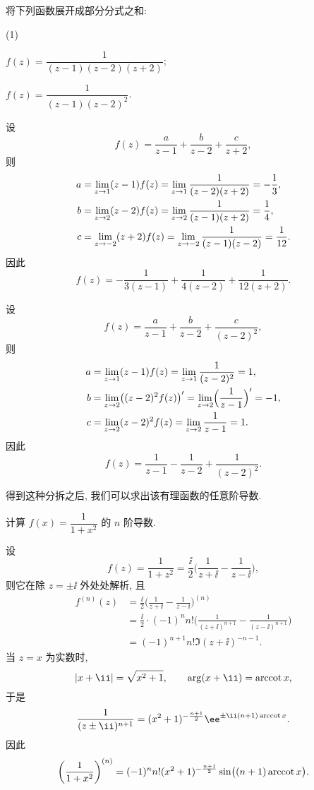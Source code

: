 \begin{example}
  将下列函数展开成部分分式之和:
  \begin{subexample}(1)
    \item $f(z)=\dfrac1{(z-1)(z-2)(z+2)}$;
    \item $f(z)=\dfrac{1}{(z-1)(z-2)^2}$.
  \end{subexample}
\end{example}

\begin{solutionenum}
  \item 设
  \[
    f(z)=\frac{a}{z-1}+\frac{b}{z-2}+\frac{c}{z+2},
  \]
  则
  \begin{align*}
    a&=\lim_{z\rightarrow1} (z-1)f(z)
      =\lim_{z\rightarrow1} \frac{1}{(z-2)(z+2)}
      =-\frac13,\\
    b&=\lim_{z\rightarrow2} (z-2)f(z)
      =\lim_{z\rightarrow2} \frac{1}{(z-1)(z+2)}
      =\frac14,\\
    c&=\lim_{z\rightarrow-2} (z+2)f(z)
      =\lim_{z\rightarrow-2} \frac{1}{(z-1)(z-2)}
      =\frac1{12}.
  \end{align*}
  因此
  \[
    f(z)=-\frac{1}{3(z-1)}+\frac{1}{4(z-2)}+\frac{1}{12(z+2)}.
  \]
  \item 设
  \[
    f(z)=\frac{a}{z-1}+\frac{b}{z-2}+\frac{c}{(z-2)^2},
  \]
  则
  \begin{align*}
    a&=\lim_{z\rightarrow1} (z-1)f(z)
      =\lim_{z\rightarrow1} \frac{1}{(z-2)^2}
      =1,\\
    b&=\lim_{z\rightarrow2} \bigl((z-2)^2f(z)\bigr)'
      =\lim_{z\rightarrow2} \Bigl(\frac{1}{z-1}\Bigr)'
      =-1,\\
    c&=\lim_{z\rightarrow2} (z-2)^2f(z)
      =\lim_{z\rightarrow2} \frac{1}{z-1}
      =1.
  \end{align*}
  因此
  \[
    f(z)=\frac{1}{z-1}-\frac{1}{z-2}+\frac{1}{(z-2)^2}.
  \]
\end{solutionenum}

得到这种分拆之后, 我们可以求出该有理函数的任意阶导数.

\begin{example}
  计算 $f(x)=\dfrac1{1+x^2}$ 的 $n$ 阶导数.
\end{example}

\begin{solution}
  设
  \[
     f(z)
    =\dfrac1{1+z^2}
    =\frac \ii2\biggl(\frac1{z+\ii}-\frac1{z-\ii}\biggr),
  \]
  则它在除 $z=\pm \ii$ 外处处解析, 且
  \begin{align*}
     f^{(n)}(z)&
    =\frac \ii2\biggl(\frac1{z+\ii}-\frac1{z-\ii}\biggr)^{(n)}\\&
    =\frac \ii2\cdot(-1)^n n!\biggl(\frac1{(z+\ii)^{n+1}}
      -\frac1{(z-\ii)^{n+1}}\biggr)\\&
    =(-1)^{n+1}n!\Im{(z+\ii)^{-n-1}}.
  \end{align*}
  当 $z=x$ 为实数时,
  \[
    |x+\ii|=\sqrt{x^2+1},\qquad
    \arg(x+\ii)=\arccot x,
  \]
  于是
  \[
    \frac1{(z\pm\ii)^{n+1}}=(x^2+1)^{-\frac{n+1}2}\ee^{\pm\ii (n+1)\arccot x}.
  \]
  因此
  \[
     \biggl(\frac1{1+x^2}\biggr)^{(n)}
    =(-1)^nn!(x^2+1)^{-\frac{n+1}2}\sin\bigl((n+1)\operatorname{arccot} x\bigr).
  \]
\end{solution}

